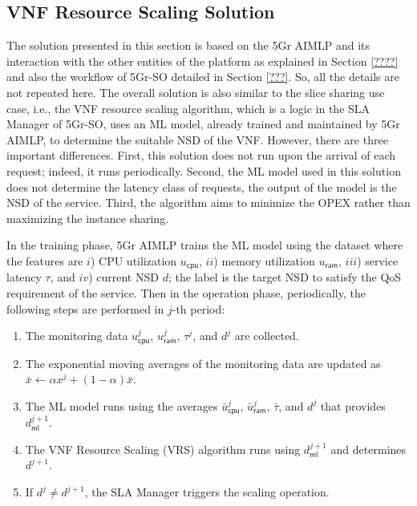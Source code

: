 \documentclass[conference, final]{IEEEtran}
\newcommand{\hlb}[2][blue]{{\color{#1} {#2}}\unskip }
\begin{document}
\subsection{VNF Resource Scaling Solution}
\label{sec:Resource-Scaling}
\hlb{


The solution presented in this section is based on the 5Gr AIMLP and its interaction with the other entities of the platform as explained in Section \ref{????} and also the workflow of 5Gr-SO detailed in Section \ref{???}. So, all the details are not repeated here. The overall solution is also similar to the slice sharing use case, i.e., the VNF resource scaling algorithm, which is a logic in the SLA Manager of 5Gr-SO, uses an ML model, already trained and maintained by 5Gr AIMLP, to determine the suitable NSD of the VNF. However, there are three important differences. First, this solution does not run upon the arrival of each request; indeed, it runs periodically. Second, the ML model used in this solution does not determine the latency class of requests, the output of the model is the NSD \text{to satisfy the QoS requirement} of the service. Third, the algorithm aims to minimize the OPEX rather than maximizing the instance sharing. 

In the training phase, 5Gr AIMLP trains the ML model using the dataset where the features are $i$) CPU utilization $u_{\textsf{cpu}}$, $ii$) memory utilization $u_{\textsf{ram}}$, $iii$) service latency $\tau$, and $iv$) current NSD $d$; the label is the target NSD to satisfy the QoS requirement of the service. Then in the operation phase, periodically, the following steps are performed in $j$-th period:
\begin{enumerate}
\item The monitoring data $u_{\textsf{cpu}}^{j}$, $u_{\textsf{ram}}^{j}$, $\tau^{j}$, and  $d^{j}$ are collected.
\item The exponential moving averages of the monitoring data are updated as $\bar{x} \leftarrow \alpha x^{j} + (1 - \alpha) \bar{x}$.
\item The ML model runs using the averages $\bar{u}_{\textsf{cpu}}^{j}$, $\bar{u}_{\textsf{ram}}^{j}$, $\bar{\tau}$, and $d^{j}$ that provides $d^{j+1}_{\textsf{ml}}$.
\item The VNF Resource Scaling (VRS) algorithm  runs using $d^{j+1}_{\textsf{ml}}$ and determines $d^{j+1}$.
\item If $d^{j} \neq d^{j+1}$, the SLA Manager triggers the  scaling  operation.
\end{enumerate}

}
\end{document}
